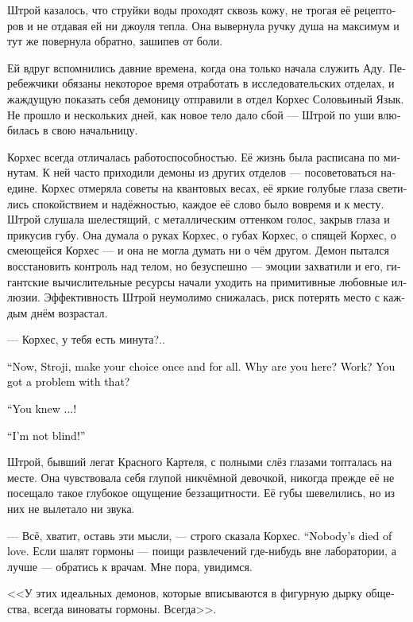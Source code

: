\documentclass[a4paper,12pt,fleqn]{book}\usepackage{cooltooltips}\usepackage{polyglossia}\setdefaultlanguage[babelshorthands=true]{russian}\setotherlanguage{english}\defaultfontfeatures{Ligatures=TeX,Mapping=tex-text} \usepackage{xcolor}\definecolor{lightgray}{HTML}{bbbbbb}\color{lightgray}\newcommand{\ml}[3]{\textenglish{\textcolor{black}{#3}}}
\begin{document}
{Штрой казалось, что струйки воды проходят сквозь кожу, не трогая её рецепторов и не отдавая ей ни джоуля тепла.
Она вывернула ручку душа на максимум и тут же повернула обратно, зашипев от боли.

Ей вдруг вспомнились давние времена, когда она только начала служить Аду.
Перебежчики обязаны некоторое время отработать в исследовательских отделах, и жаждущую показать себя демоницу отправили в отдел Корхес Соловьиный Язык.
Не прошло и нескольких дней, как новое тело дало сбой --- Штрой по уши влюбилась в свою начальницу.

Корхес всегда отличалась работоспособностью.
Её жизнь была расписана по минутам.
К ней часто приходили демоны из других отделов --- посоветоваться наедине.
Корхес отмеряла советы на квантовых весах, её яркие голубые глаза светились спокойствием и надёжностью, каждое её слово было вовремя и к месту.
Штрой слушала шелестящий, с металлическим оттенком голос, закрыв глаза и прикусив губу.
Она думала о руках Корхес, о губах Корхес, о спящей Корхес, о смеющейся Корхес --- и она не могла думать ни о чём другом.
Демон пытался восстановить контроль над телом, но безуспешно --- эмоции захватили и его, гигантские вычислительные ресурсы начали уходить на примитивные любовные иллюзии.
Эффективность Штрой неумолимо снижалась, риск потерять место с каждым днём возрастал.

--- Корхес, у тебя есть минута?..

\ml{$0-[ej]$}
{--- Так, Штрой, реши для себя раз и навсегда.}
{``Now, Stroji, make your choice once and for all.}
\ml{$0-[ej]$}
{Ты зачем сюда пришла?}
{Why are you here?}
\ml{$0-[ej]$}
{Работать?}
{Work?}
\ml{$0-[ej]$}
{Какие с этим проблемы?}
{You got a problem with that?}

\ml{$0-[ej]$}
{--- Так ты знаешь?..}
{``You knew ...!}

\ml{$0-[ej]$}
{--- Я не слепая!}
{``I'm not blind!''}

Штрой, бывший легат Красного Картеля, с полными слёз глазами топталась на месте.
Она чувствовала себя глупой никчёмной девочкой, никогда прежде её не посещало такое глубокое ощущение беззащитности.
Её губы шевелились, но из них не вылетало ни звука.

--- Всё, хватит, оставь эти мысли, --- строго сказала Корхес.
\ml{$0-[ej]$}
{--- От любви ещё никто не умер.}
{``Nobody's died of love.}
Если шалят гормоны --- поищи развлечений где-нибудь вне лаборатории, а лучше --- обратись к врачам.
Мне пора, увидимся.

<<У этих идеальных демонов, которые вписываются в фигурную дырку общества, всегда виноваты гормоны.
Всегда>>.

}
\end{document}
